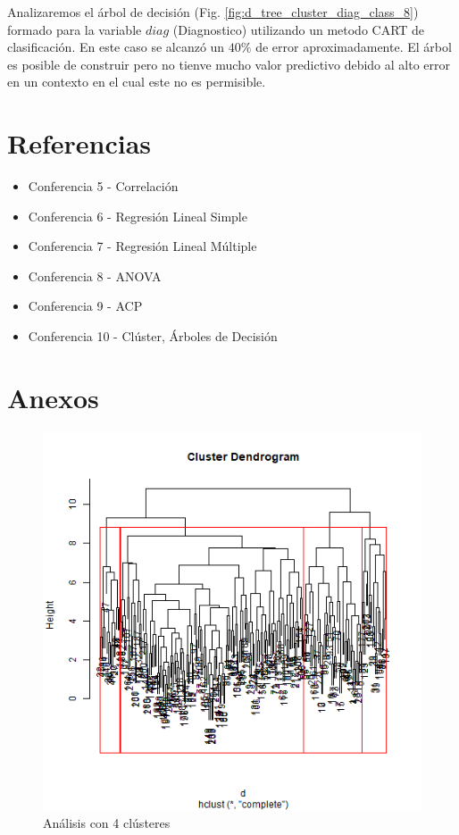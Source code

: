 \documentclass[a4paper,10pt,twocolumn]{article}
\begin{document}
	Analizaremos el árbol de decisión (Fig. \ref{fig:d_tree_cluster_diag_class_8}) formado para la variable $diag$ (Diagnostico) utilizando un metodo CART de clasificación. En este caso se alcanzó un $40\%$ de error aproximadamente. El árbol es posible de construir pero no tienve mucho valor predictivo debido al alto error en un contexto en el cual este no es permisible.
	
	\section{Referencias}\label{sec:ref}
	
	\begin{itemize}
		\item Conferencia 5 - Correlación
		\item Conferencia 6 - Regresión Lineal Simple
		\item Conferencia 7 - Regresión Lineal Múltiple
		\item Conferencia 8 - ANOVA
	 	\item Conferencia 9 - ACP
		\item Conferencia 10 - Clúster, Árboles de Decisión
	\end{itemize}
	
	\newpage
	
	\section{Anexos}\label{sec:anexos}
	
	\begin{figure}[htb]%
		\begin{center}
			\includegraphics[width=\linewidth]{hier_cluster_4_euclidean}
		\end{center}
		\caption{Análisis con 4 clústeres \label{fig:hier_cluster_4_euclidean}}%
	\end{figure}
	
\end{document}
